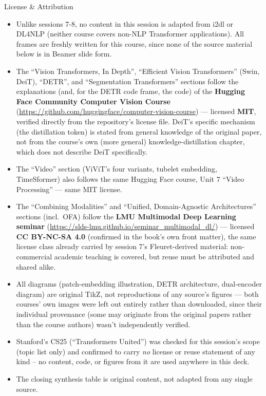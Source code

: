 \begin{vbframe}{License \& Attribution}
\begin{itemize}
\item Unlike sessions 7-8, no content in this session is adapted from i2dl or DL4NLP (neither course covers non-NLP Transformer applications). All frames are freshly written for this course, since none of the source material below is in Beamer slide form.
\item The \enquote{Vision Transformers, In Depth}, \enquote{Efficient Vision Transformers} (Swin, DeiT), \enquote{DETR}, and \enquote{Segmentation Transformers} sections follow the explanations (and, for the DETR code frame, the code) of the \textbf{Hugging Face Community Computer Vision Course} (\url{https://github.com/huggingface/computer-vision-course}) --- licensed \textbf{MIT}, verified directly from the repository's license file. DeiT's specific mechanism (the distillation token) is stated from general knowledge of the original paper, not from the course's own (more general) knowledge-distillation chapter, which does not describe DeiT specifically.
\item The \enquote{Video} section (ViViT's four variants, tubelet embedding, TimeSformer) also follows the same Hugging Face course, Unit 7 \enquote{Video Processing} --- same MIT license.
\item The \enquote{Combining Modalities} and \enquote{Unified, Domain-Agnostic Architectures} sections (incl.\ OFA) follow the \textbf{LMU Multimodal Deep Learning seminar} (\url{https://slds-lmu.github.io/seminar_multimodal_dl/}) --- licensed \textbf{CC BY-NC-SA 4.0} (confirmed in the book's own front matter), the same license class already carried by session 7's Fleuret-derived material: non-commercial academic teaching is covered, but reuse must be attributed and shared alike.
\item All diagrams (patch-embedding illustration, DETR architecture, dual-encoder diagram) are original TikZ, not reproductions of any source's figures --- both courses' own images were left out entirely rather than downloaded, since their individual provenance (some may originate from the original papers rather than the course authors) wasn't independently verified.
\item Stanford's CS25 (\enquote{Transformers United}) was checked for this session's scope (topic list only) and confirmed to carry \emph{no} license or reuse statement of any kind -- no content, code, or figures from it are used anywhere in this deck.
\item The closing synthesis table is original content, not adapted from any single source.

\end{itemize}
\end{vbframe}
